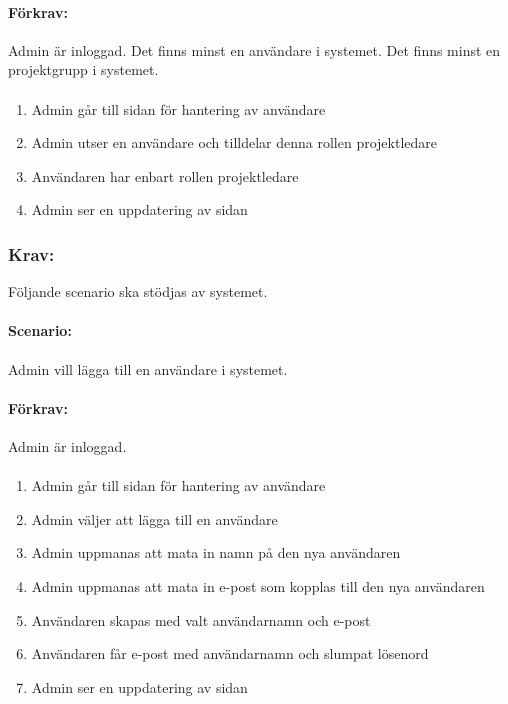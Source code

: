 \documentclass[paper=a4, fontsize=11pt,twoside]{article}
\begin{document}
	\paragraph{Förkrav:}
	Admin är inloggad. Det finns minst en användare i systemet. Det finns minst en projektgrupp i systemet.
	\paragraph{}
	\begin{enumerate}
		\item Admin går till sidan för hantering av användare
		\item Admin utser en användare och tilldelar denna rollen projektledare
		\item Användaren har enbart rollen projektledare
		\item Admin ser en uppdatering av sidan
	\end{enumerate}
	
	\subsubsection{Krav:} Följande scenario ska stödjas av systemet. 
	\paragraph{Scenario:}
	Admin vill lägga till en användare i systemet.
	\paragraph{Förkrav:}
	Admin är inloggad. 
	\paragraph{}
	\begin{enumerate}
		\item Admin går till sidan för hantering av användare
		\item Admin väljer att lägga till en användare
		\item Admin uppmanas att mata in namn på den nya användaren
		\item Admin uppmanas att mata in e-post som kopplas till den nya användaren
		\item Användaren skapas med valt användarnamn och e-post
		\item Användaren får e-post med användarnamn och slumpat lösenord
		\item Admin ser en uppdatering av sidan
	\end{enumerate}
	
\end{document}
